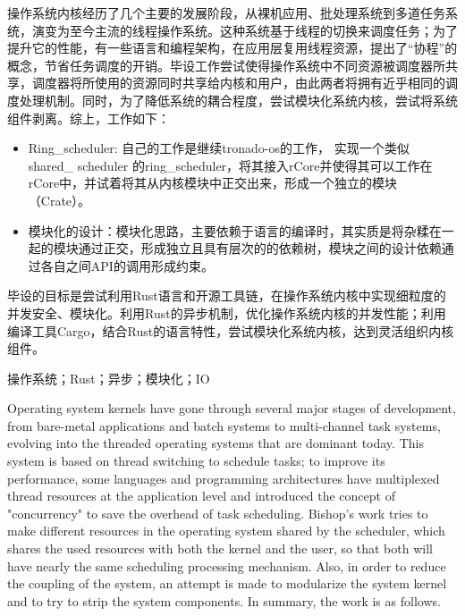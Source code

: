 \setlength{\headheight}{1.5cm}

\abstractcn


操作系统内核经历了几个主要的发展阶段，从裸机应用、批处理系统到多道任务系统，演变为至今主流的线程操作系统。这种系统基于线程的切换来调度任务；为了提升它的性能，有一些语言和编程架构，在应用层复用线程资源，提出了“协程”的概念，节省任务调度的开销。毕设工作尝试使得操作系统中不同资源被调度器所共享，调度器将所使用的资源同时共享给内核和用户，由此两者将拥有近乎相同的调度处理机制。同时，为了降低系统的耦合程度，尝试模块化系统内核，尝试将系统组件剥离。综上，工作如下：

\begin{itemize}
\item Ring\_scheduler: 自己的工作是继续tronado-os的工作， 实现一个类似 shared\_ scheduler 的ring\_scheduler，将其接入rCore并使得其可以工作在rCore中，并试着将其从内核模块中正交出来，形成一个独立的模块（Crate）。 

\item 模块化的设计：模块化思路，主要依赖于语言的编译时，其实质是将杂糅在一起的模块通过正交，形成独立且具有层次的的依赖树，模块之间的设计依赖通过各自之间API的调用形成约束。
\end{itemize}


毕设的目标是尝试利用Rust语言和开源工具链，在操作系统内核中实现细粒度的并发安全、模块化。利用Rust的异步机制，优化操作系统内核的并发性能；利用编译工具Cargo，结合Rust的语言特性，尝试模块化系统内核，达到灵活组织内核组件。

\keywordscn\quad 操作系统；Rust；异步；模块化；IO
\abstracten

Operating system kernels have gone through several major stages of development, from bare-metal applications and batch systems to multi-channel
task systems, evolving into the threaded operating systems that are dominant today. This system is based on thread switching to schedule tasks; to improve its performance, some languages and programming architectures have multiplexed thread resources at the application level and introduced the concept of "concurrency" to save the overhead of task scheduling. Bishop's work tries to make different resources in the operating system shared by the scheduler, which shares the used resources with both the kernel and the user, so that both will have nearly the same scheduling processing mechanism. Also, in order to reduce the coupling of the system, an attempt is made to modularize the system kernel and to try to strip the system components. In summary, the work is as follows.

